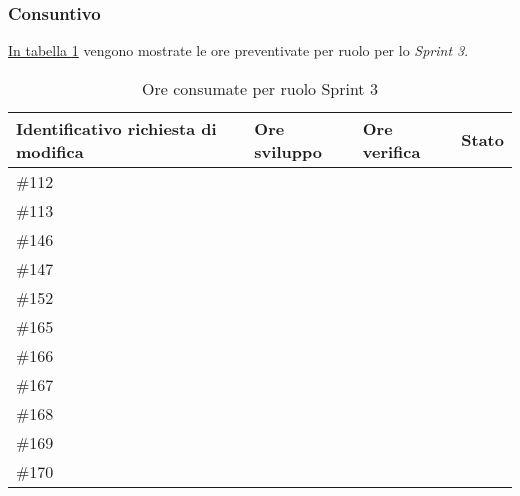 \subsubsection{Consuntivo}

\hyperref[tab:sprint3_ore_consumate]{In tabella \ref{tab:sprint3_ore_consumate}} vengono mostrate le ore preventivate per ruolo per lo \textit{Sprint 3}.

\begin{table}[H]
    \centering
        \begin{tabular}{| l | l | l | l |}
            \hline
                \textbf{Identificativo richiesta di modifica} & 
                \textbf{Ore sviluppo} &
                \textbf{Ore verifica} & 
                \textbf{Stato}\\ 
    \hline
        \#112 &  & &\\
    \hline
        \#113 &  & &\\
    \hline
        \#146 &  & &\\
    \hline
        \#147 &  & &\\
    \hline
        \#152 &  & &\\
    \hline
        \#165 &  & &\\
    \hline
        \#166 &  & &\\
    \hline
        \#167 &  & &\\
    \hline
        \#168 &  & &\\
    \hline
        \#169 &  & &\\
    \hline
        \#170 & & &\\
    \hline
    \end{tabular}
    \caption{Ore consumate per ruolo Sprint 3}
    \label{tab:sprint3_ore_consumate} 
\end{table}
